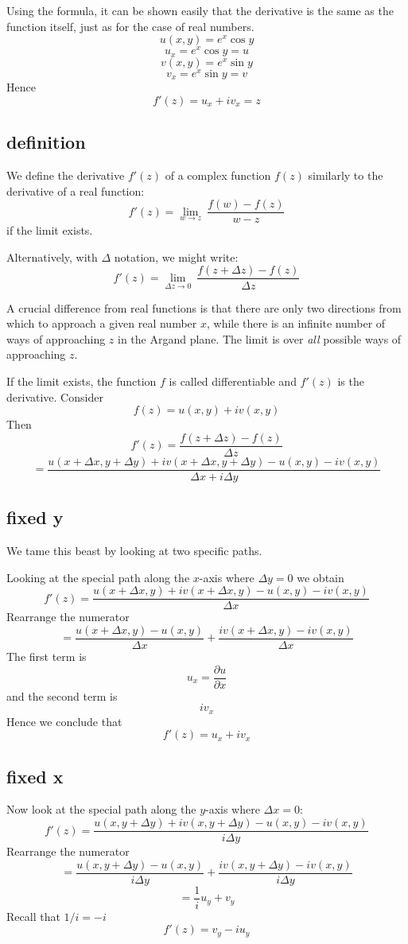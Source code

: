 \documentclass[11pt, oneside]{article}
\begin{document}
Using the formula, it can be shown easily that the derivative is the same as the function itself, just as for the case of real numbers.
\[ u(x,y) = e^x \cos y \]
\[ u_x = e^x \cos y = u \]
\[ v(x,y) = e^x \sin y \]
\[ v_x = e^x \sin y = v \]
Hence
\[f'(z) = u_x + iv_x = z \]

\subsection*{definition}
We define the derivative $f'(z)$ of a complex function $f(z)$ similarly to the derivative of a real function:
\[ f'(z) = \lim_{w \rightarrow z} \ \frac{f(w) - f(z)}{w-z} \]
if the limit exists.

Alternatively, with $\Delta$ notation, we might write:
\[ f'(z) = \lim_{\Delta z \rightarrow 0} \ \frac{f(z + \Delta z) - f(z)}{\Delta z} \]

A crucial difference from real functions is that there are only two directions from which to approach a given real number $x$, while there is an infinite number of ways of approaching $z$ in the Argand plane.  The limit is over \emph{all} possible ways of approaching $z$.  

If the limit exists, the function $f$ is called differentiable and $f'(z)$ is the derivative.
Consider
\[ f(z) = u(x,y) + i v(x,y) \]
Then
\[ f'(z) = \frac{f(z + \Delta z) - f(z)}{\Delta z} \]
\[ = \frac{u(x + \Delta x, y + \Delta y) + i v (x + \Delta x, y + \Delta y) - u(x,y) - i v(x,y)}{\Delta x + i \Delta y} \]

\subsection*{fixed y}
We tame this beast by looking at two specific paths.

Looking at the special path along the $x$-axis where $\Delta y = 0$ we obtain
\[ f'(z) = \frac{u(x + \Delta x, y) + i v (x + \Delta x, y) - u(x,y) - i v(x,y)}{\Delta x} \]
Rearrange the numerator
\[ = \frac{u(x + \Delta x, y) - u(x,y)}{\Delta x} + \frac{i v (x + \Delta x, y) - i v(x,y)}{\Delta x} \]
The first term is
\[ u_x = \frac{\partial u}{\partial x} \]
and the second term is 
\[ i v_x \]
Hence we conclude that
\[ f'(z) = u_x + i v_x \]

\subsection*{fixed x}
Now look at the special path along the $y$-axis where $\Delta x = 0$:
\[ f'(z) = \frac{u(x, y + \Delta y) + i v (x, y + \Delta y) - u(x,y) - i v(x,y)}{i \Delta y} \]
Rearrange the numerator
\[ = \frac{u(x, y + \Delta y) - u(x,y)}{i \Delta y} + \frac{i v (x, y + \Delta y) - i v(x,y)}{i \Delta y} \]
\[ = \frac{1}{i} u_y + v_y \]
Recall that $1/i = -i$
\[ f'(z) = v_y - i u_y \]
\end{document}
